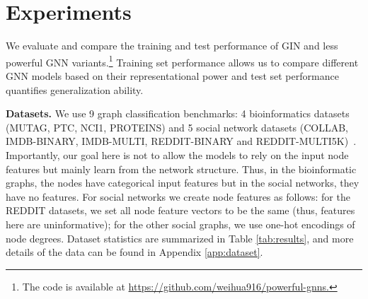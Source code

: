 
\vspace*{-5pt}

\section{Experiments}
\label{sec:experiments}

We evaluate and compare the training and test performance of GIN and less powerful GNN variants.\footnote{The code is available at \url{https://github.com/weihua916/powerful-gnns.}} Training set performance allows us to compare different GNN models based on their representational power and test set performance quantifies generalization ability.

{\bf Datasets.} We use 9 graph classification benchmarks: 4 bioinformatics datasets (MUTAG, PTC, NCI1, PROTEINS) and 5 social network datasets (COLLAB, IMDB-BINARY, IMDB-MULTI, REDDIT-BINARY and REDDIT-MULTI5K)~\citep{yanardag2015deep}. Importantly, our goal here is not to allow the models to rely on the input node features but mainly learn from the network structure. Thus, in the bioinformatic graphs, the nodes have categorical input features but in the social networks, they have no features. For social networks we create node features as follows: for the REDDIT datasets, we set all node feature vectors to be the same (thus, features here are uninformative); for the other social graphs, we use one-hot encodings of node degrees. Dataset statistics are summarized in Table \ref{tab:results}, and more details of the data can be found in Appendix \ref{app:dataset}. 

